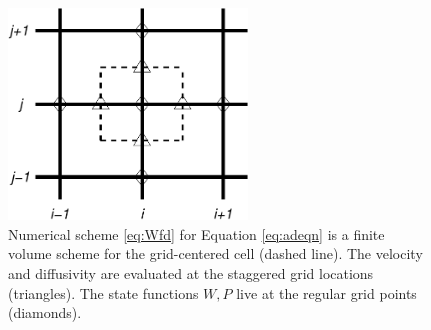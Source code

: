 \documentclass[11pt,final]{amsart}%
\begin{document}
\begin{figure}[ht]
\centering
\includegraphics[width=2.5in,keepaspectratio=true]{figs/diffstencil}
\bigskip
\caption{Numerical scheme \eqref{eq:Wfd} for Equation \eqref{eq:adeqn} is a finite volume scheme for the grid-centered cell (dashed line).  The velocity and diffusivity are evaluated at the staggered grid locations (triangles).  The state functions $W,P$ live at the regular grid points (diamonds).}
\label{fig:stencil}
\end{figure}
\end{document}
